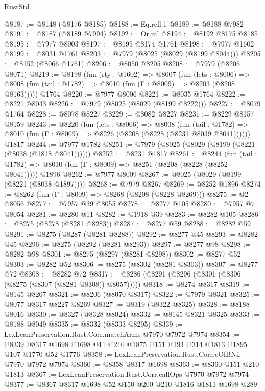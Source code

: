 \begin{lexlean}{RustStd}
\begin{coremodule}
@8187 := @8148 (@8176 @8185)
@8188 := Eq.refl.{1}
@8189 := @8188 @7982
@8191 := @8187 (@8189 @7994)
@8192 := Or.inl
@8194 := @8192 @8175 @8185
@8195 := @7977 @8003
@8197 := @8195 @8174 @1761
@8198 := @7977 @1602
@8199 := @8031 @1761
@8203 := @7979 (@8025 (@8029 (@8199 @8044)))
@8205 := @8152 (@8066 @1761)
@8206 := @8050 @8205
@8208 := @7979 (@8206 @8071)
@8219 := @8198
    (fun (rty : @1602) =>
    @8007
      (fun (lets : @8006) =>
      @8008 (fun (tail : @1782) => @8010 (fun (Γ : @8009) => @8203 (@8208 @8163)))))
    @1764
@8220 := @7977 @8006
@8221 := @8035 @1764
@8222 := @8221 @8043
@8226 := @7979 (@8025 (@8029 (@8199 @8222)))
@8227 := @8079 @1764
@8228 := @8078 @8227
@8229 := @8082 @8227
@8231 := @8229 @8157 @8159
@8243 := @8220
    (fun (lets : @8006) =>
    @8008
      (fun (tail : @1782) => @8010 (fun (Γ : @8009) => @8226 (@8208 (@8228 (@8231 @8039 @8041))))))
    @1817
@8244 := @7977 @1782
@8251 := @7979 (@8025 (@8029 (@8199 (@8221 (@8038 (@1818 @8041))))))
@8252 := @8231 @1817
@8261 := @8244
    (fun (tail : @1782) => @8010 (fun (Γ : @8009) => @8251 (@8208 (@8228 (@8252 @8041)))))
    @1896
@8262 := @7977 @8009
@8267 := @8025 (@8029 (@8199 (@8221 (@8038 @1897))))
@8268 := @7979 @8267
@8269 := @8252 @1896
@8274 := @8262 (fun (Γ : @8009) => @8268 (@8208 (@8228 @8269)))
@8275 := @2 @8056
@8277 := @7957 @39 @8055
@8278 := @8277 @105
@8280 := @7957 @7 @8054
@8281 := @8280 @11
@8282 := @1918 @39
@8283 := @8282 @105
@8286 := @8275 (@8278 (@8281 @8283))
@8287 := @8277 @59
@8288 := @8282 @59
@8291 := @8275 (@8287 (@8281 @8288))
@8292 := @8277 @45
@8293 := @8282 @45
@8296 := @8275 (@8292 (@8281 @8293))
@8297 := @8277 @98
@8298 := @8282 @98
@8301 := @8275 (@8297 (@8281 @8298))
@8302 := @8277 @52
@8303 := @8282 @52
@8306 := @8275 (@8302 (@8281 @8303))
@8307 := @8277 @72
@8308 := @8282 @72
@8317 := @8286 (@8291 (@8296 (@8301 (@8306 (@8275 (@8307 (@8281 @8308)) @8057)))))
@8318 := @8274 @8317
@8319 := @8145 @8267
@8321 := @8206 (@8070 @8317)
@8322 := @7979 @8321
@8325 := @8077 @8317 @8227 @8269
@8327 := @8319 (@8322 @8325)
@8328 := @8188 @8016
@8330 := @8327 (@8328 @8024)
@8332 := @8145 @8321 @8325
@8333 := @8188 @8049
@8335 := @8332 (@8333 @8205)
@8339 := LexLeanPreservation.Rust.Corr.matchArms @7970 @7972 @7974
@8354 := @8339 @8317 @1698 @1698 @11 @210 @1875 @151 @194 @314 @1813 @1895 @107 @1770 @52 @1776
@8358 := LexLeanPreservation.Rust.Corr.eOfBNil @7970 @7972 @7974
@8360 := @8358 @8317 @1698
@8363 := @8360 @151 @210 @1813
@8367 := LexLeanPreservation.Rust.Corr.callOps @7970 @7972 @7974
@8377 := @8367 @8317 @1698 @52 @150 @200 @210 @1816 @1811 @1698 @289

\end{coremodule}
\end{lexlean}
